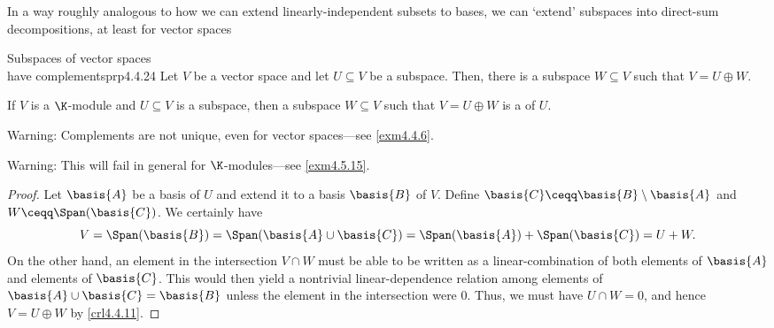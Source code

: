 In a way roughly analogous to how we can extend linearly-independent subsets to bases, we can `extend' subspaces into direct-sum decompositions, at least for vector spaces
\begin{prp}{Subspaces of vector spaces \\ have complements}{prp4.4.24}
	Let $V$ be a vector space and let $U\subseteq V$ be a subspace.  Then, there is a subspace $W\subseteq V$ such that $V=U\oplus W$.
	\begin{rmk}
		If $V$ is a $\K$-module and $U\subseteq V$ is a subspace, then a subspace $W\subseteq V$ such that $V=U\oplus W$ is a  of $U$.
	\end{rmk}
	\begin{rmk}
		Warning:  Complements are not unique, even for vector spaces---see \cref{exm4.4.6}.
	\end{rmk}
	\begin{rmk}
		Warning:  This will fail in general for $\K$-modules---see \cref{exm4.5.15}.
	\end{rmk}
	\begin{proof}
		Let $\basis{A}$ be a basis of $U$ and extend it to a basis $\basis{B}$ of $V$.  Define $\basis{C}\ceqq \basis{B}\setminus \basis{A}$ and $W\ceqq \Span (\basis{C})$.  We certainly have
		\begin{equation}
			V=\Span (\basis{B})=\Span (\basis{A}\cup \basis{C})=\Span (\basis{A})+\Span (\basis{C})=U+W.
		\end{equation}
		On the other hand, an element in the intersection $V\cap W$ must be able to be written as a linear-combination of both elements of $\basis{A}$ and elements of $\basis{C}$.  This would then yield a nontrivial linear-dependence relation among elements of $\basis{A}\cup \basis{C}=\basis{B}$ unless the element in the intersection were $0$.  Thus, we must have $U\cap W=0$, and hence $V=U\oplus W$ by \cref{crl4.4.11}.
	\end{proof}
\end{prp}

